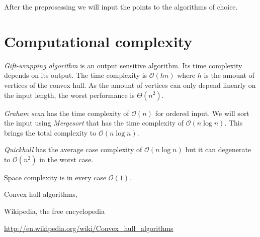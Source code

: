 \documentclass[a4paper,12pt,leqno,titlepage]{article}
\newcommand{\bigO}{\mathcal{O}}
\begin{document}
After the preprosessing we will input the points to the algorithms of choice.

\pagebreak
\section{Computational complexity}


\emph{Gift-wrapping algorithm} is an output sensitive algorithm.
Its time complexity depends on its output.
The time complexity is $\bigO(hn)$ where $h$ is the amount of vertices of the convex hull.
As the amount of vertices can only depend linearly on the input length, the worst performance is $\Theta(n^2)$.

\emph{Graham scan} has the time complexity of $\bigO(n)$ for ordered input.
We will sort the input using \emph{Mergesort} that has the time complexity of $\bigO(n\log n)$.
This brings the total complexity to $\bigO(n\log n)$.

\emph{Quickhull} has the average case complexity of $\bigO(n\log n)$ but it can degenerate to $\bigO(n^2)$ in the worst case.

Space complexity is in every case $\bigO(1)$.


\pagebreak


\begin{thebibliography}{9}

Convex hull algorithms,

Wikipedia, the free encyclopedia

\url{http://en.wikipedia.org/wiki/Convex_hull_algorithms}


\end{thebibliography}
\end{document}
